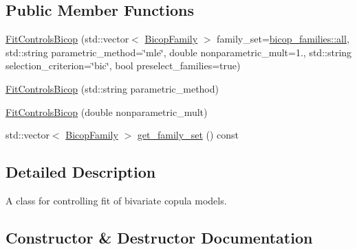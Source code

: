 \subsection*{Public Member Functions}
\begin{DoxyCompactItemize}
\item 
\hyperlink{classvinecopulib_1_1_fit_controls_bicop_a544d095b0ef0a99e08b8ca60a5753fbe}{Fit\+Controls\+Bicop} (std\+::vector$<$ \hyperlink{namespacevinecopulib_a42e95cc06d33896199caab0c11ad44f3}{Bicop\+Family} $>$ family\+\_\+set=\hyperlink{namespacevinecopulib_1_1bicop__families_a5214a513f41ec23b74782aab96ea6774}{bicop\+\_\+families\+::all}, std\+::string parametric\+\_\+method=\char`\"{}mle\char`\"{}, double nonparametric\+\_\+mult=1., std\+::string selection\+\_\+criterion=\char`\"{}bic\char`\"{}, bool preselect\+\_\+families=true)
\item 
\hyperlink{classvinecopulib_1_1_fit_controls_bicop_a6a2fc00794c9dd9d598ac9948e7b98e4}{Fit\+Controls\+Bicop} (std\+::string parametric\+\_\+method)
\item 
\hyperlink{classvinecopulib_1_1_fit_controls_bicop_a4fc0ec257a3501ebfa15ea36f821cdec}{Fit\+Controls\+Bicop} (double nonparametric\+\_\+mult)
\end{DoxyCompactItemize}
{\bf }\par
\begin{DoxyCompactItemize}
\item 
std\+::vector$<$ \hyperlink{namespacevinecopulib_a42e95cc06d33896199caab0c11ad44f3}{Bicop\+Family} $>$ \hyperlink{classvinecopulib_1_1_fit_controls_bicop_a8ea096aec62cbca55641941c9b4cf8f8}{get\+\_\+family\+\_\+set} () const 
\end{DoxyCompactItemize}



\subsection{Detailed Description}
A class for controlling fit of bivariate copula models. 

\subsection{Constructor \& Destructor Documentation}
